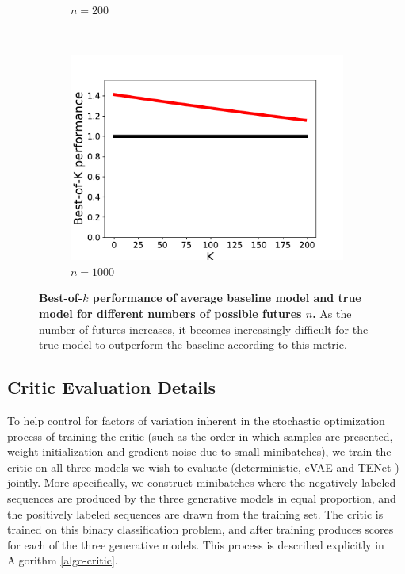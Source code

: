 \documentclass{article}
\newcommand{\modelname}{TENet }
\begin{document}
\begin{figure}
\begin{subfigure}[b]{0.3\textwidth}
    \caption{$n=200$}
    \label{fig:tiger}
  \end{subfigure}
  ~ %
  \begin{subfigure}[b]{0.3\textwidth}
    \includegraphics[width=\textwidth]{images/best_of_k_toy_n1000.pdf}
    \caption{$n=1000$}
    \label{fig:mouse}
  \end{subfigure}
  \caption{
    \textbf{Best-of-$k$ performance of average baseline model and true model for different numbers of possible futures $n$.}
    As the number of futures increases, it becomes increasingly difficult for the true model to outperform the baseline according to this metric.}
  \label{expected-loss}
\end{figure}




\subsection{Critic Evaluation Details}
\label{critic-details}

To help control for factors of variation inherent in the stochastic optimization process of training the critic (such as the order in which samples are presented, weight initialization and gradient noise due to small minibatches), we train the critic on all three models we wish to evaluate (deterministic, cVAE and \modelname) jointly.
More specifically, we construct minibatches where the negatively labeled sequences are produced by the three generative models in equal proportion, and the positively labeled sequences are drawn from the training set.
The critic is trained on this binary classification problem, and after training produces scores for each of the three generative models.
This process is described explicitly in Algorithm \ref{algo-critic}.
\end{document}
